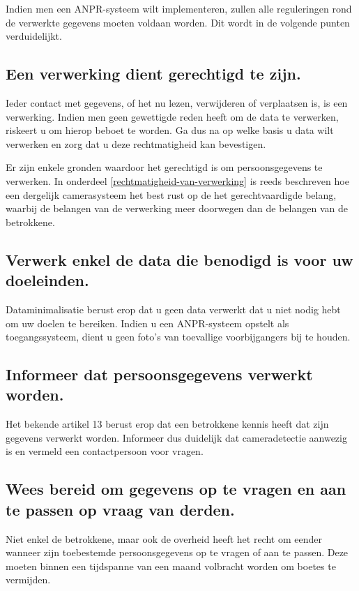 Indien men een ANPR-systeem wilt implementeren, zullen alle reguleringen rond de verwerkte gegevens moeten voldaan worden. Dit wordt in de volgende punten verduidelijkt.

\subsection{Een verwerking dient gerechtigd te zijn.}
Ieder contact met gegevens, of het nu lezen, verwijderen of verplaatsen is, is een verwerking. Indien men geen gewettigde reden heeft om de data te verwerken, riskeert u om hierop beboet te worden. Ga dus na op welke basis u data wilt verwerken en zorg dat u deze rechtmatigheid kan bevestigen.

Er zijn enkele gronden waardoor het gerechtigd is om persoonsgegevens te verwerken. In onderdeel \ref{rechtmatigheid-van-verwerking} is reeds beschreven hoe een dergelijk camerasysteem het best rust op de het gerechtvaardigde belang, waarbij de belangen van de verwerking meer doorwegen dan de belangen van de betrokkene. 

\subsection{Verwerk enkel de data die benodigd is voor uw doeleinden.}
Dataminimalisatie berust erop dat u geen data verwerkt dat u niet nodig hebt om uw doelen te bereiken. Indien u een ANPR-systeem opstelt als toegangssysteem, dient u geen foto's van toevallige voorbijgangers bij te houden.

\subsection{Informeer dat persoonsgegevens verwerkt worden.}
Het bekende artikel 13 berust erop dat een betrokkene kennis heeft dat zijn gegevens verwerkt worden. Informeer dus duidelijk dat cameradetectie aanwezig is en vermeld een contactpersoon voor vragen.

\subsection{Wees bereid om gegevens op te vragen en aan te passen op vraag van derden.}
Niet enkel de betrokkene, maar ook de overheid heeft het recht om eender wanneer zijn toebestemde persoonsgegevens op te vragen of aan te passen. Deze moeten binnen een tijdspanne van een maand volbracht worden om boetes te vermijden.

